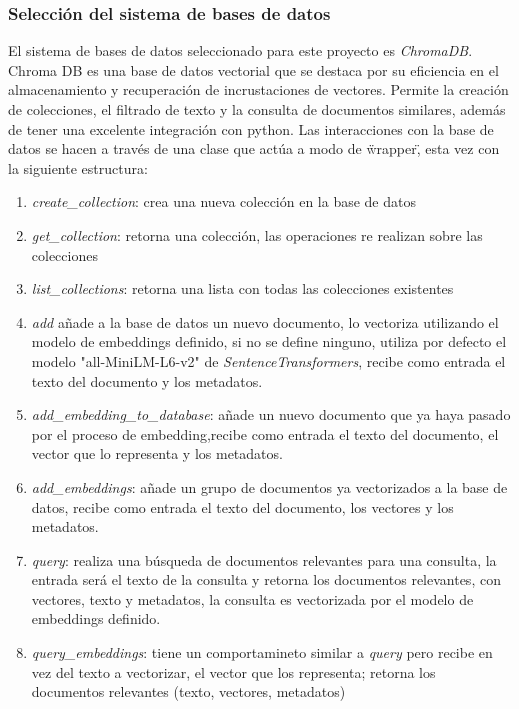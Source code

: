         \subsubsection{Selección del sistema de bases de datos}
            El sistema de bases de datos seleccionado para este proyecto es \emph{ChromaDB}\cite{chromadb}. Chroma DB es una base de datos vectorial que se destaca por su eficiencia en el almacenamiento y recuperación de incrustaciones de vectores. Permite la creación de colecciones, el filtrado de texto y la consulta de documentos similares, además de tener una excelente integración con python.
        Las interacciones con la base de datos se hacen a través de una clase que actúa a modo de \"wrapper\", esta vez con la siguiente estructura:
        \begin{enumerate}
            \item \emph{create_collection}: crea una nueva colección en la base de datos 
            \item \emph{get_collection}: retorna una colección, las operaciones re realizan sobre las colecciones
            \item \emph{list_collections}: retorna una lista con todas las colecciones existentes
            \item \emph{add} añade a la base de datos un nuevo documento, lo vectoriza utilizando el modelo de embeddings definido, si no se define ninguno, utiliza por defecto el modelo "all-MiniLM-L6-v2" de \emph{SentenceTransformers}, recibe como entrada el texto del documento y los metadatos.
            \item \emph{add_embedding_to_database}: añade un nuevo documento que ya haya pasado por el proceso de embedding,recibe como entrada el texto del documento, el vector que lo representa y los metadatos.
            \item \emph{add_embeddings}: añade un grupo de documentos ya vectorizados a la base de datos, recibe como entrada el texto del documento, los vectores y los metadatos. 
            \item \emph{query}: realiza una búsqueda de documentos relevantes para una consulta, la entrada será el texto  de la consulta y retorna los documentos relevantes, con vectores, texto y metadatos, la consulta es vectorizada por el modelo de embeddings definido.
            \item \emph{query_embeddings}: tiene un comportamineto similar a \emph{query} pero recibe en vez del texto a vectorizar, el vector que los representa; retorna los documentos relevantes (texto, vectores, metadatos)
        \end{enumerate}

